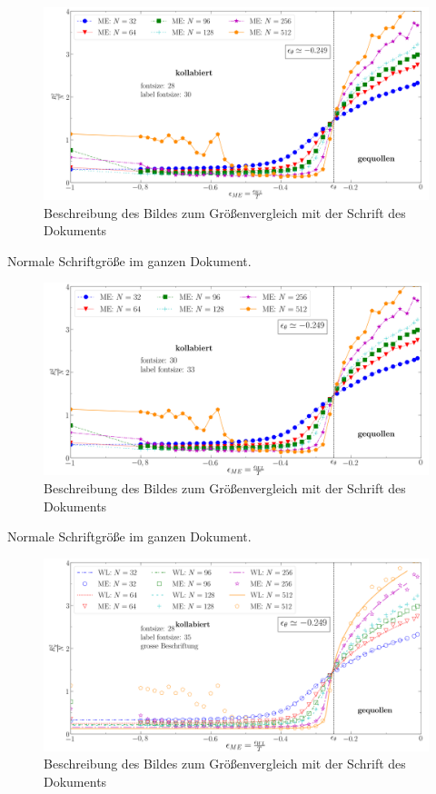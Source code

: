 \begin{figure}[H]

\includegraphics[width=\textwidth]{png_28_30.png}
\caption{Beschreibung des Bildes zum Größenvergleich mit der Schrift des Dokuments}
\end{figure}
Normale Schriftgröße im ganzen Dokument.
\begin{figure}[H]
\includegraphics[width=\textwidth]{png_30_30.png}
\caption{Beschreibung des Bildes zum Größenvergleich mit der Schrift des Dokuments}
\end{figure}
Normale Schriftgröße im ganzen Dokument.
\begin{figure}[H]
\includegraphics[width=\textwidth]{pngwl_28_28}
\caption{Beschreibung des Bildes zum Größenvergleich mit der Schrift des Dokuments}
\end{figure}
